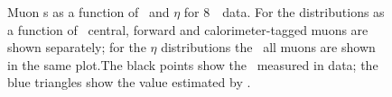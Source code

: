 \begin{figure}[h!]
\centering
\vspace{-8mm}
    \caption[Muon \FakeFactor s as a function of \pt\ and $\eta$ for 8~\tev\ data.]
    {Muon \FakeFactor s as a function of \pt\ and $\eta$ for 8~\tev\ data. 
    For the distributions as a function of \pt\, central, forward and calorimeter-tagged muons are shown
    separately; for the $\eta$ distributions the \ffactor\ all muons are
    shown in the same plot.The black points show the \ffactor\ measured in
    data; the blue triangles show the value estimated by \mc.}
\label{fig:ff-mu-eight} 
\end{figure}

